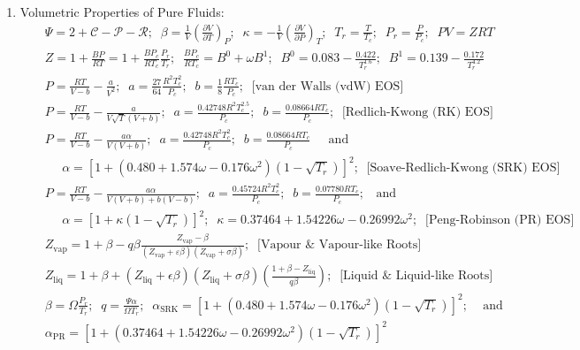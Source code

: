 \documentclass[12pts,a4paper,amsmath,amssymb,floatfix]{article}%
\newcommand{\frc}{\displaystyle\frac}
\newcommand{\Partial}[3][error]{\left(\frc{\partial #1}{\partial #2}\right)_{#3}}
\begin{document}
\begin{enumerate}[1)]
\item Volumetric Properties of Pure Fluids:
  \begin{eqnarray}
    && \Psi = 2 + \mathcal{C} - \mathcal{P} -\mathcal{R};\;\; \beta = \frc{1}{V}\Partial[V]{T}{P};\;\; \kappa = -\frc{1}{V}\Partial[V]{P}{T};\;\;T_{r} = \frc{T}{T_{c}};\;\; P_{r} = \frc{P}{P_{c}};\;\; PV=ZRT \nonumber \\
    &&  Z = 1 + \frc{B P}{R T} = 1 + \frc{B P_{c}}{R T_{c}}\frc{P_{r}}{T_{r}};\;\; \frc{B P_{c}}{R T_{c}} = B^{0} + \omega B^{1};\;\; B^{0} = 0.083 - \frc{0.422}{T_{r}^{1.6}}; \;\; B^{1} = 0.139 - \frc{0.172}{T_{r}^{4.2}} \nonumber \\
    && P = \frc{R T}{V-b} - \frc{a}{V^{2}};\;\;a = \frc{27}{64}\frc{R^{2}T_{c}^{2}}{P_{c}};\;\; b = \frc{1}{8}\frc{R T_{c}}{P_{c}};\;\; \text{[van der Walls (vdW) EOS]} \nonumber \\
    && P = \frc{R T}{V-b} - \frc{a}{V\sqrt{T}\left(V+b\right)};\;\;a = \frc{0.42748 R^{2}T_{c}^{2.5}}{P_{c}};\;\; b = \frc{0.08664 R T_{c} }{P_{c}};\;\;\text{[Redlich-Kwong (RK) EOS]}  \nonumber \\
    && P = \frc{R T}{V-b} - \frc{a\alpha}{V\left(V+b\right)};\;\; a = \frc{0.42748 R^{2}T_{c}^{2}}{P_{c}};\;\; b = \frc{0.08664 R T_{c} }{P_{c}}\;\;\;\;\text{ and } \nonumber \\
    && \;\;\;\;\; \alpha = \left[1 + \left( 0.480 + 1.574\omega - 0.176\omega^{2}\right)\left(1-\sqrt{T_{r}}\right)\right]^{2}; \;\;\text{[Soave-Redlich-Kwong (SRK) EOS]}  \nonumber \\
    && P = \frc{R T}{V-b} - \frc{a\alpha}{V\left(V+b\right)+b\left(V-b\right)};\;\; a = \frc{0.45724 R^{2}T_{c}^{2}}{P_{c}};\;\;b = \frc{0.07780 R T_{c} }{P_{c}};\;\;\text{ and } \nonumber \\
    &&\;\;\;\;\;\alpha = \left[1 + \kappa\left(1-\sqrt{T_{r}}\right)\right]^{2};\;\; \kappa = 0.37464 + 1.54226\omega - 0.26992\omega^{2};\;\; \text{[Peng-Robinson (PR) EOS]}  \nonumber \\
    && Z_{\text{vap}} = 1 + \beta - q\beta \frc{Z_{\text{vap}} - \beta} {\left(Z_{\text{vap}}+\varepsilon\beta\right)\left(Z_{\text{vap}} +\sigma\beta\right)};\;\;\text{[Vapour $\&$ Vapour-like Roots]} \nonumber \\
    && Z_{\text{liq}} = 1 + \beta + \left(Z_{\text{liq}} + \epsilon\beta\right)\left(Z_{\text{liq}}+\sigma\beta\right)\left(\frc{1+\beta-Z_{\text{liq}}}{q\beta}\right);\;\;\text{[Liquid $\&$ Liquid-like Roots]} \nonumber \\
    && \beta=\Omega\frc{P_{r}}{T_{r}};\;\; q=\frc{\Psi\alpha}{\Omega T_{r}};\;\;\alpha_{\text{SRK}} = \left[ 1 + \left( 0.480 + 1.574 \omega - 0.176\omega^{2}\right)\left(1-\sqrt{T_{r}}\right)\right]^{2};\;\;\;\text{ and } \nonumber \\
    && \alpha_{\text{PR}} = \left[ 1 + \left( 0.37464 + 1.54226 \omega - 0.26992\omega^{2}\right)\left(1-\sqrt{T_{r}}\right)\right]^{2} \nonumber
  \end{eqnarray}


\end{enumerate}
\end{document}
